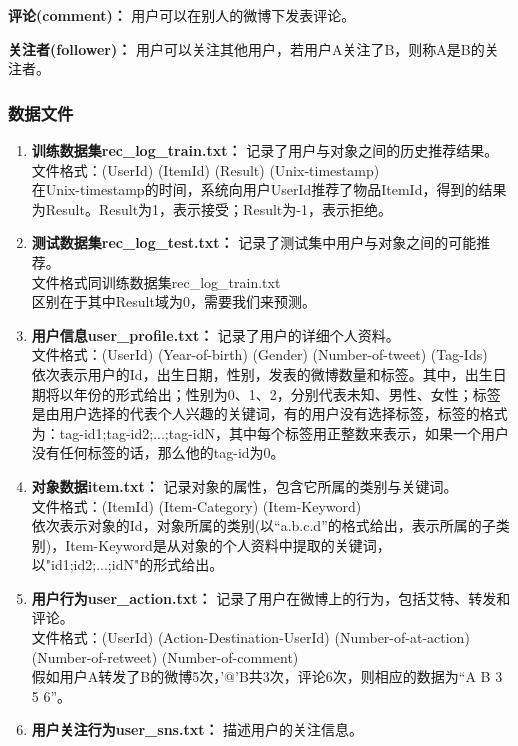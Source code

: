 \documentclass[12pt]{article} %
\begin{document}
\begin{sloppypar}
{\bf 评论(comment)：} 用户可以在别人的微博下发表评论。

{\bf 关注者(follower)：} 用户可以关注其他用户，若用户A关注了B，则称A是B的关注者。

\subsubsection{数据文件}

\begin{enumerate}
	\item {\bf 训练数据集rec\_log\_train.txt：} 记录了用户与对象之间的历史推荐结果。\\
	文件格式：(UserId) (ItemId) (Result) (Unix-timestamp)\\
	在Unix-timestamp的时间，系统向用户UserId推荐了物品ItemId，得到的结果为Result。Result为1，表示接受；Result为-1，表示拒绝。
	\item {\bf 测试数据集rec\_log\_test.txt：} 记录了测试集中用户与对象之间的可能推荐。\\
	文件格式同训练数据集rec\_log\_train.txt\\
	区别在于其中Result域为0，需要我们来预测。
	\item {\bf 用户信息user\_profile.txt：} 记录了用户的详细个人资料。\\
	文件格式：(UserId) (Year-of-birth) (Gender) (Number-of-tweet) (Tag-Ids) \\
	依次表示用户的Id，出生日期，性别，发表的微博数量和标签。其中，出生日期将以年份的形式给出；性别为0、1、2，分别代表未知、男性、女性；标签是由用户选择的代表个人兴趣的关键词，有的用户没有选择标签，标签的格式为：tag-id1;tag-id2;...;tag-idN，其中每个标签用正整数来表示，如果一个用户没有任何标签的话，那么他的tag-id为0。
	\item {\bf 对象数据item.txt：} 记录对象的属性，包含它所属的类别与关键词。\\
	文件格式：(ItemId) (Item-Category) (Item-Keyword) \\
	依次表示对象的Id，对象所属的类别(以“a.b.c.d”的格式给出，表示所属的子类别)，Item-Keyword是从对象的个人资料中提取的关键词，以"id1;id2;...;idN"的形式给出。
	\item {\bf 用户行为user\_action.txt：} 记录了用户在微博上的行为，包括艾特、转发和评论。 \\
	文件格式：(UserId) (Action-Destination-UserId) (Number-of-at-action) (Number-of-retweet) (Number-of-comment) \\
	假如用户A转发了B的微博5次，'@'B共3次，评论6次，则相应的数据为“A B 3 5 6”。
	\item {\bf 用户关注行为user\_sns.txt：} 描述用户的关注信息。 \\

\end{enumerate}
\end{sloppypar}
\end{document}
